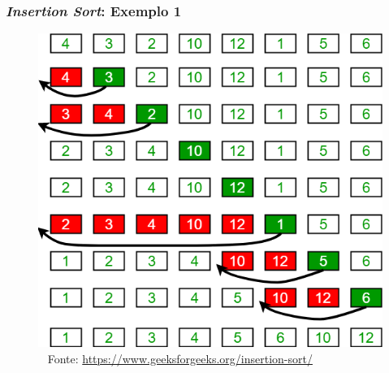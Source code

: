 \documentclass[aspectratio=169]{beamer}
\begin{document}
\begin{frame}\frametitle{\emph{Insertion Sort}: Exemplo 1}
\begin{figure}[h]
	\centering
	\includegraphics[height=0.6\paperheight]{imagens/insertion_sort.png}\\
	~ {\tiny Fonte: \url{https://www.geeksforgeeks.org/insertion-sort/}}
\end{figure}
\end{frame}
\end{document}
